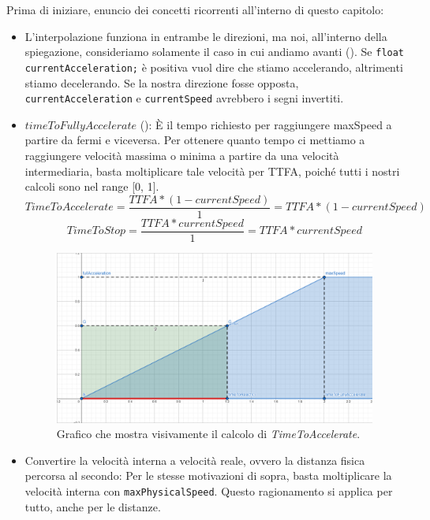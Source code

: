\documentclass[main.tex]{subfiles}
\begin{document}
Prima di iniziare, enuncio dei concetti ricorrenti all'interno di questo capitolo:
\begin{itemize}
    \item L'interpolazione funziona in entrambe le direzioni, ma noi, all'interno della spiegazione, consideriamo solamente il caso in cui andiamo avanti (). Se \lstinline{float currentAcceleration;} è positiva vuol dire che stiamo accelerando, altrimenti stiamo decelerando. Se la nostra direzione fosse opposta, \lstinline{currentAcceleration} e \lstinline{currentSpeed} avrebbero i segni invertiti.
    \item $timeToFullyAccelerate$ (): È il tempo richiesto per raggiungere maxSpeed a partire da fermi e viceversa. Per ottenere quanto tempo ci mettiamo a raggiungere velocità massima o minima a partire da una velocità intermediaria, basta moltiplicare tale velocità per TTFA, poiché tutti i nostri calcoli sono nel range [0, 1].
    \[TimeToAccelerate = \frac{TTFA * (1 - currentSpeed)}{1} = TTFA * (1 - currentSpeed)\]
    \[TimeToStop = \frac{TTFA * currentSpeed}{1} = TTFA * currentSpeed\]
    \begin{figure}[H]
        \centering
        \includegraphics[width=.65\linewidth]{img/interpolazione/timeToFullyAccelerate.png}
        \caption{Grafico che mostra visivamente il calcolo di \textit{TimeToAccelerate}.}
        \label{fig:4_timeToFullyAccelerate}
    \end{figure}
    \item Convertire la velocità interna a velocità reale, ovvero la distanza fisica percorsa al secondo: Per le stesse motivazioni di sopra, basta moltiplicare la velocità interna con \lstinline{maxPhysicalSpeed}. Questo ragionamento si applica per tutto, anche per le distanze.
\end{itemize}
\end{document}
